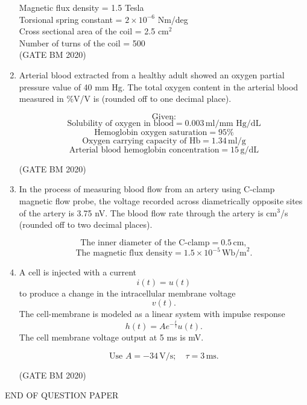 \documentclass[journal]{IEEEtran}
\begin{document}
\begin{enumerate}
Magnetic flux density = 1.5 Tesla \\
Torsional spring constant = $2 \times 10^{-6}$ Nm/deg \\
Cross sectional area of the coil = 2.5 cm$^2$ \\
Number of turns of the coil = 500 \\

\hfill(GATE BM 2020)

\item Arterial blood extracted from a healthy adult showed an oxygen partial pressure value of 40 mm Hg. The total oxygen content in the arterial blood measured in \%V/V is \underline{\hspace{2cm}} (rounded off to one decimal place).

\[
\text{Given:}
\]
\[
\text{Solubility of oxygen in blood} = 0.003 \, \text{ml/mm Hg/dL}
\]
\[
\text{Hemoglobin oxygen saturation} = 95\%
\]
\[
\text{Oxygen carrying capacity of Hb} = 1.34 \, \text{ml/g}
\]
\[
\text{Arterial blood hemoglobin concentration} = 15 \, \text{g/dL}
\]


\hfill(GATE BM 2020)
\item In the process of measuring blood flow from an artery using C-clamp magnetic flow probe, the voltage recorded across diametrically opposite sites of the artery is 3.75 nV. The blood flow rate through the artery is \underline{\hspace{2cm}} cm$^3$/s (rounded off to two decimal places).

\[
\text{The inner diameter of the C-clamp} = 0.5 \, \text{cm},
\]
\[
\text{The magnetic flux density} = 1.5 \times 10^{-5} \, \text{Wb/m}^2.
\]

\item A cell is injected with a current 
\[
i(t) = u(t)
\]
to produce a change in the intracellular membrane voltage 
\[
v(t).
\]
The cell-membrane is modeled as a linear system with impulse response 
\[
h(t) = A e^{-\tfrac{t}{\tau}} u(t).
\]
The cell membrane voltage output at 5 ms is \underline{\hspace{2cm}} mV.

\[
\text{Use } A = -34 \, \text{V/s}; \quad \tau = 3 \, \text{ms}.
\]



\hfill(GATE BM 2020)
\end{enumerate}

\begin{center}
	\huge{END OF QUESTION PAPER}
\end{center}
\end{document}

